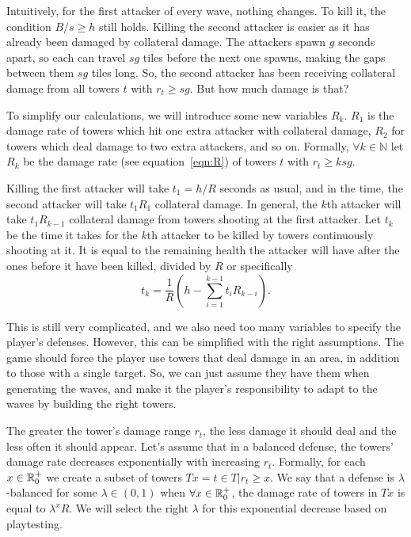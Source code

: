 Intuitively, for the first attacker of every wave, nothing changes.
To kill it, the condition $B/s \geq h$ still holds.
Killing the second attacker is easier as it has already been damaged by collateral damage.
The attackers spawn $g$ seconds apart, so each can travel $sg$ tiles before the next one spawns, making the gaps between them $sg$ tiles long.
So, the second attacker has been receiving collateral damage from all towers $t$ with $r_t \geq sg$.
But how much damage is that?

To simplify our calculations, we will introduce some new variables $R_k$.
$R_1$ is the damage rate of towers which hit one extra attacker with collateral damage, $R_2$ for towers which deal damage to two extra attackers, and so on.
Formally, $\forall k \in \mathbb{N}$ let $R_k$ be the damage rate (see equation~\ref{eqn:R}) of towers $t$ with $r_t \geq ksg$.

Killing the first attacker will take $t_1 = h/R$ seconds as usual, and in the time, the second attacker will take $t_1 R_1$ collateral damage.
In general, the $k$th attacker will take $t_1 R_{k-1}$ collateral damage from towers shooting at the first attacker.
Let $t_k$ be the time it takes for the $k$th attacker to be killed by towers continuously shooting at it.
It is equal to the remaining health the attacker will have after the ones before it have been killed, divided by $R$ or specifically
\begin{equation}\label{eqn:time-to-kill}
    t_k = \frac{1}{R}\left(h - \sum_{i=1}^{k-1} t_i R_{k-i} \right).
\end{equation}

This is still very complicated, and we also need too many variables to specify the player's defenses.
However, this can be simplified with the right assumptions.
The game should force the player use towers that deal damage in an area, in addition to those with a single target.
So, we can just assume they have them when generating the waves, and make it the player's responsibility to adapt to the waves by building the right towers.

The greater the tower's damage range $r_t$, the less damage it should deal and the less often it should appear.
Let's assume that in a balanced defense, the towers' damage rate decreases exponentially with increasing $r_t$.
Formally, for each $x \in \mathbb{R}_0^+$ we create a subset of towers $Tx = {t \in T \vert r_t \geq x}$.
We say that a defense is $\lambda$-balanced for some $\lambda \in (0,1)$ when $\forall x \in \mathbb{R}_0^+$, the damage rate of towers in $Tx$ is equal to $\lambda^x R$.
We will select the right $\lambda$ for this exponential decrease based on playtesting.

